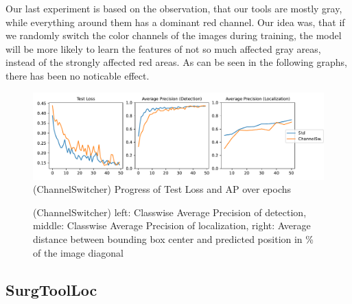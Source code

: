 Our last experiment is based on the observation, that our tools are mostly gray, while everything around them has a dominant red channel. Our idea was, that if we randomly switch the color channels of the images during training, the model will be more likely to learn the features of not so much affected gray areas, instead of the strongly affected red areas. As can be seen in the following graphs, there has been no noticable effect.

\begin{figure}[h]
	\centering
	\includegraphics[width=15cm]{4_experiments/images/2_cs_exp/APs.pdf}
	\caption{(ChannelSwitcher) Progress of Test Loss and AP over epochs}
	\label{fig:cs_aps}
\end{figure}

\begin{figure}[h]
	\centering
	\caption{(ChannelSwitcher) left: Classwise Average Precision of detection, middle: Classwise Average Precision of localization, right: Average distance between bounding box center and predicted position in \% of the image diagonal}
	\label{fig:cd_distances}
\end{figure}


\FloatBarrier
\subsection{SurgToolLoc}

